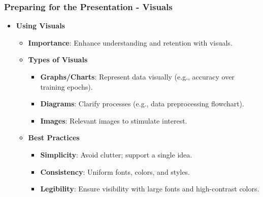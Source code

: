 \documentclass{beamer}
\begin{document}
\begin{frame}[fragile]
    \frametitle{Preparing for the Presentation - Visuals}
    
    \begin{itemize}
        \item \textbf{Using Visuals}
        \begin{itemize}
            \item \textbf{Importance}: Enhance understanding and retention with visuals.
            \item \textbf{Types of Visuals}
                \begin{itemize}
                    \item \textbf{Graphs/Charts}: Represent data visually (e.g., accuracy over training epochs).
                    \item \textbf{Diagrams}: Clarify processes (e.g., data preprocessing flowchart).
                    \item \textbf{Images}: Relevant images to stimulate interest.
                \end{itemize}
            \item \textbf{Best Practices}
                \begin{itemize}
                    \item \textbf{Simplicity}: Avoid clutter; support a single idea.
                    \item \textbf{Consistency}: Uniform fonts, colors, and styles.
                    \item \textbf{Legibility}: Ensure visibility with large fonts and high-contrast colors.
                \end{itemize}
        \end{itemize}
    \end{itemize}
\end{frame}
\end{document}
